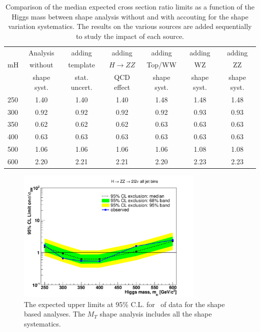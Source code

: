 \begin{table}[!ht]
\begin{center}
{\normalsize
\begin{tabular}{|l|c|ccccc|}
\hline
      &  Analysis    & adding          &  adding      &  adding      & adding      & adding \\
mH  &  without     & template        &  $H\to ZZ$   &  Top/WW             & WZ          & ZZ \\
      &  shape syst. & stat. uncert.   &  QCD effect &  shape syst. & shape syst. & shape syst. \\
\hline
250 & 1.40 & 1.40 & 1.40 & 1.48 & 1.48 & 1.48 \\   
300 & 0.92 & 0.92 & 0.92 & 0.92 & 0.93 & 0.93 \\ 
350 & 0.62 & 0.62 & 0.62 & 0.63 & 0.63 & 0.63 \\
400 & 0.63 & 0.63 & 0.63 & 0.63 & 0.63 & 0.63 \\
500 & 1.06 & 1.06 & 1.06 & 1.06 & 1.08 & 1.08 \\
600 & 2.20 & 2.21 & 2.21 & 2.20 & 2.23 & 2.23 \\
\hline
\end{tabular}
}
\caption{Comparison of the median expected cross section ratio limits as a function 
of the Higgs mass between shape analysis without and with accouting for the 
shape variation systematics. The results on the various sources are added sequentially 
to study the impact of each source. } %
\label{tab:mva_mtshape_detail}
\end{center}
\end{table}

\begin{figure}[!htbp]
\begin{center}
   \includegraphics[width=0.8\textwidth]{figures/limits_mtshape_5fb.pdf}
   \caption{ The expected upper limits at 95\% C.L. for \intlumi\ of data for the shape based
    analyses. The $M_T$ shape analysis includes all the shape systematics. }
   \label{fig:limits_5fb}
\end{center}
\end{figure}
